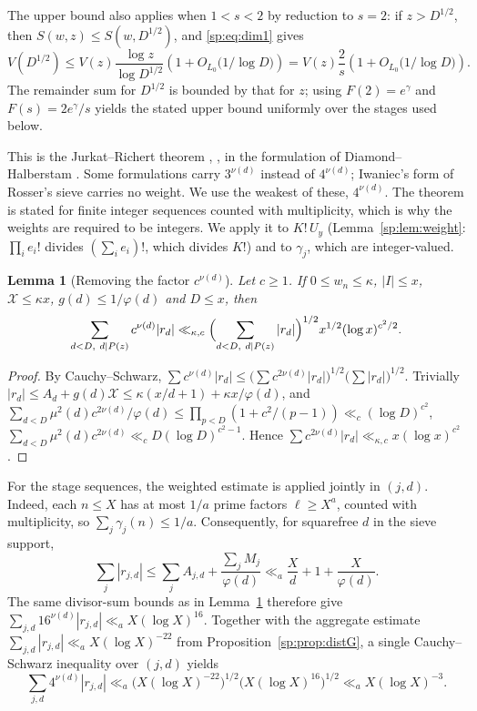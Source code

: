 \documentclass[final,11pt]{elsarticle}
\newtheorem{lemma}[theorem]{Lemma}
\theoremstyle{definition}
\theoremstyle{remark}
\numberwithin{equation}{section}
\begin{document}
The upper bound also applies when $1<s<2$ by reduction to $s=2$:
if $z>D^{1/2}$, then $S(w,z)\le S(w,D^{1/2})$, and
\eqref{sp:eq:dim1} gives
\[
 V(D^{1/2})\le V(z)\frac{\log z}{\log D^{1/2}}
 \left(1+O_{L_0}\bigl(1/\log D\bigr)\right)
 =V(z)\frac2s\left(1+O_{L_0}\bigl(1/\log D\bigr)\right).
\]
The remainder sum for $D^{1/2}$ is bounded by that for $z$;
using $F(2)=e^\gamma$ and $F(s)=2e^\gamma/s$ yields the
stated upper bound uniformly over the stages used below.

This is the Jurkat--Richert theorem \cite[p.~230]{JurkatRichert},
\cite[p.~231]{HR}, in the formulation of
Diamond--Halberstam \cite[p.~81]{DiamondHalberstam2008}. Some formulations
carry $3^{\nu(d)}$ instead of $4^{\nu(d)}$; Iwaniec's form of Rosser's sieve
\cite{Iwaniec80} carries no weight. We use the weakest of these,
$4^{\nu(d)}$. The theorem is stated for finite integer sequences counted with
multiplicity, which is why the weights are required to be integers. We apply it
to $K!\,U_y$ (Lemma~\ref{sp:lem:weight}: $\prod_ie_i!$ divides $(\sum_ie_i)!$, which
divides $K!$) and to $\gamma_j$, which are integer-valued.

\begin{lemma}[Removing the factor $c^{\nu(d)}$]\label{sp:lem:3nu}
Let $c\ge1$. If $0\le w_n\le\kappa$, $|I|\le x$, $\mathcal X\le\kappa x$,
$g(d)\le1/\varphi(d)$ and $D\le x$, then
\[
 \sum_{d<D,\ d\mid P(z)}c^{\nu(d)}|r_d|
 \ll_{\kappa,c}\Bigl(\sum_{d<D,\ d\mid P(z)}|r_d|\Bigr)^{1/2}x^{1/2}(\log x)^{c^2/2}.
\]
\end{lemma}

\begin{proof}
By Cauchy--Schwarz,
$\sum c^{\nu(d)}|r_d|\le\bigl(\sum c^{2\nu(d)}|r_d|\bigr)^{1/2}\bigl(\sum|r_d|\bigr)^{1/2}$.
Trivially $|r_d|\le A_d+g(d)\mathcal X\le\kappa(x/d+1)+\kappa x/\varphi(d)$, and
$\sum_{d<D}\mu^2(d)c^{2\nu(d)}/\varphi(d)\le\prod_{p<D}(1+c^2/(p-1))\ll_c(\log D)^{c^2}$,
$\sum_{d<D}\mu^2(d)c^{2\nu(d)}\ll_c D(\log D)^{c^2-1}$. Hence
$\sum c^{2\nu(d)}|r_d|\ll_{\kappa,c}x(\log x)^{c^2}$.
\end{proof}

For the stage sequences, the weighted estimate is applied jointly in $(j,d)$.
Indeed, each $n\le X$ has at most $1/a$ prime factors $\ell\ge X^a$,
counted with multiplicity, so $\sum_j\gamma_j(n)\le1/a$. Consequently,
for squarefree $d$ in the sieve support,
\[
 \sum_j|r_{j,d}|\le\sum_j A_{j,d}+\frac{\sum_j M_j}{\varphi(d)}
 \ll_a \frac Xd+1+\frac X{\varphi(d)}.
\]
The same divisor-sum bounds as in Lemma~\ref{sp:lem:3nu} therefore give
$\sum_{j,d}16^{\nu(d)}|r_{j,d}|\ll_a X(\log X)^{16}$.
Together with the aggregate estimate
$\sum_{j,d}|r_{j,d}|\ll_a X(\log X)^{-22}$ from
Proposition~\ref{sp:prop:distG}, a single Cauchy--Schwarz inequality over
$(j,d)$ yields
\[
 \sum_{j,d}4^{\nu(d)}|r_{j,d}|
 \ll_a \bigl(X(\log X)^{-22}\bigr)^{1/2}
          \bigl(X(\log X)^{16}\bigr)^{1/2}
 \ll_a X(\log X)^{-3}.
\]
\end{document}
